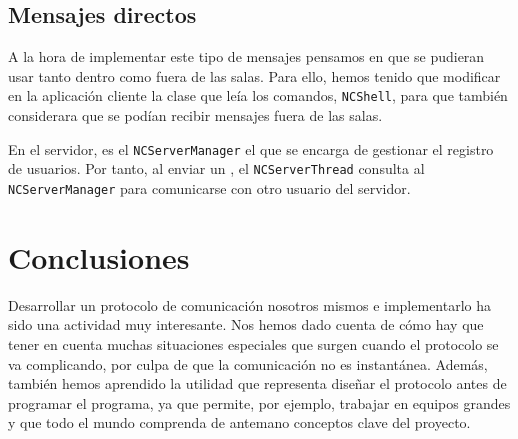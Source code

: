 

\subsection{Mensajes directos}
A la hora de implementar este tipo de mensajes pensamos en que se pudieran usar tanto dentro como fuera de las salas. Para ello, hemos tenido que modificar en la aplicación cliente la clase que leía los comandos, \lstinline!NCShell!, para que también considerara que se podían recibir mensajes fuera de las salas.

En el servidor, es el \lstinline!NCServerManager! el que se encarga de gestionar el registro de usuarios. Por tanto, al enviar un , el \lstinline!NCServerThread! consulta al \lstinline!NCServerManager! para comunicarse con otro usuario del servidor.







\section{Conclusiones}
Desarrollar un protocolo de comunicación nosotros mismos e implementarlo ha sido una actividad muy interesante. Nos hemos dado cuenta de cómo hay que tener en cuenta muchas situaciones especiales que surgen cuando el protocolo se va complicando, por culpa de que la comunicación no es instantánea. Además, también hemos aprendido la utilidad que representa diseñar el protocolo antes de programar el programa, ya que permite, por ejemplo, trabajar en equipos grandes y que todo el mundo comprenda de antemano conceptos clave del proyecto.